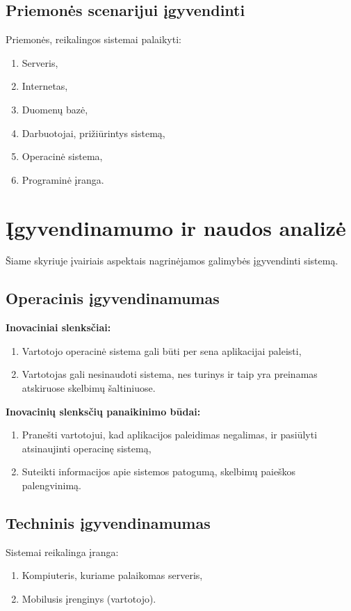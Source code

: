 \documentclass[12pt]{article}
\begin{document}
	\subsection{Priemonės scenarijui įgyvendinti}
	Priemonės, reikalingos sistemai palaikyti:
	\begin{enumerate}
		\item{Serveris,}
		\item{Internetas,}
		\item{Duomenų bazė,}
		\item{Darbuotojai, prižiūrintys sistemą,}
		\item{Operacinė sistema,}
		\item{Programinė įranga.}
	\end{enumerate}
	\pagebreak
	
	\section{Įgyvendinamumo ir naudos analizė}
	
	Šiame skyriuje įvairiais aspektais nagrinėjamos galimybės įgyvendinti sistemą.
	
	\subsection{Operacinis įgyvendinamumas}
	
	\textbf{Inovaciniai slenksčiai:}
	\begin{enumerate}
		\item{Vartotojo operacinė sistema gali būti per sena aplikacijai paleisti,}
		\item{Vartotojas gali nesinaudoti sistema, nes turinys ir taip yra preinamas atskiruose skelbimų šaltiniuose.}
	\end{enumerate}
	
	\textbf{Inovacinių slenksčių panaikinimo būdai:}
	\begin{enumerate}
		\item{Pranešti vartotojui, kad aplikacijos paleidimas negalimas, ir pasiūlyti atsinaujinti operacinę sistemą,}
		\item{Suteikti informacijos apie sistemos patogumą, skelbimų paieškos palengvinimą.}
	\end{enumerate}
	
	
	\subsection{Techninis įgyvendinamumas}
	Sistemai reikalinga įranga:
	\begin{enumerate}
		\item{Kompiuteris, kuriame palaikomas serveris,}
		\item{Mobilusis įrenginys (vartotojo).}
	\end{enumerate}
	
\end{document}
